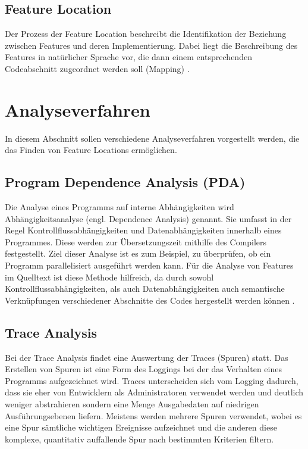 \documentclass[runningheads,a4paper]{llncs}
\begin{document}
\subsection*{Feature Location}
Der Prozess der Feature Location beschreibt die Identifikation der Beziehung zwischen Features und deren Implementierung. Dabei liegt die Beschreibung des Features in natürlicher Sprache vor, die dann einem entsprechenden Codeabschnitt zugeordnet werden soll (Mapping) \cite{survey}.

\section{Analyseverfahren}

In diesem Abschnitt sollen verschiedene Analyseverfahren vorgestellt werden, die das Finden von Feature Locations ermöglichen.


\subsection*{Program Dependence Analysis (PDA)}

Die Analyse eines Programms auf interne Abhängigkeiten wird Abhängigkeitsanalyse (engl. Dependence Analysis) genannt. Sie umfasst in der Regel Kontrollflussabhängigkeiten und Datenabhängigkeiten innerhalb eines Programmes. Diese werden zur Übersetzungszeit mithilfe des Compilers festgestellt. Ziel dieser Analyse ist es zum Beispiel, zu überprüfen, ob ein Programm parallelisiert ausgeführt werden kann. Für die Analyse von Features im Quelltext ist diese Methode hilfreich, da durch sowohl Kontrollflussabhängigkeiten, als auch Datenabhängigkeiten auch semantische Verknüpfungen verschiedener Abschnitte des Codes hergestellt werden können \cite{PDA}.

\subsection*{Trace Analysis}
Bei der Trace Analysis findet eine Auswertung der Traces (Spuren) statt. Das Erstellen von Spuren ist eine Form des Loggings bei der das Verhalten eines Programms aufgezeichnet wird. Traces unterscheiden sich vom Logging dadurch, dass sie eher von Entwicklern als Administratoren verwendet werden und deutlich weniger abstrahieren sondern eine Menge Ausgabedaten auf niedrigen Ausführungsebenen liefern. Meistens werden mehrere Spuren verwendet, wobei es eine Spur sämtliche wichtigen Ereignisse aufzeichnet und die anderen diese komplexe, quantitativ auffallende Spur nach bestimmten Kriterien filtern. 
\end{document}
